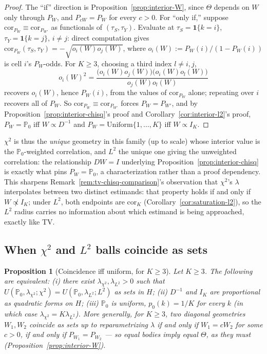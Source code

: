 \documentclass[11pt]{article}
\theoremstyle{plain}
\newtheorem{proposition}[theorem]{Proposition}
\theoremstyle{definition}
\theoremstyle{remark}
\newcommand{\PP}{\mathbb{P}}
\newcommand{\Corr}{\mathrm{cor}}
\begin{document}
\begin{proof}
The ``if'' direction is Proposition~\ref{prop:interior-W}, since $\Theta$ depends on
$W$ only through $P_W$, and $P_{cW}=P_W$ for every $c>0$. For ``only if,'' suppose
$\Corr_{P_W}\equiv\Corr_{P_{W'}}$ as functionals of $(\tau_S,\tau_Y)$. Evaluate at
$\tau_S=\mathbf1\{k=i\}$, $\tau_Y=\mathbf1\{k=j\}$, $i\ne j$: direct computation gives
$\Corr_{P_W}(\tau_S,\tau_Y)=-\sqrt{o_i(W)o_j(W)}$, where
$o_i(W):=P_W(i)/(1-P_W(i))$ is cell $i$'s $P_W$-odds. For $K\ge3$, choosing a third
index $l\ne i,j$,
\[
    o_i(W)^2=\frac{\big(o_i(W)o_j(W)\big)\big(o_i(W)o_l(W)\big)}{o_j(W)o_l(W)}
\]
recovers $o_i(W)$, hence $P_W(i)$, from the values of $\Corr_{P_W}$ alone; repeating
over $i$ recovers all of $P_W$. So $\Corr_{P_W}\equiv\Corr_{P_{W'}}$ forces
$P_W=P_{W'}$, and by Proposition~\ref{prop:interior-chisq}'s proof and
Corollary~\ref{cor:interior-l2}'s proof, $P_W=\PP_0$ iff $W\propto D^{-1}$ and
$P_W=\mathrm{Uniform}\{1,\dots,K\}$ iff $W\propto I_K$.
\end{proof}

$\chi^2$ is thus the \emph{unique} geometry in this family (up to scale) whose interior
value is the $\PP_0$-weighted correlation, and $L^2$ the unique one giving the
unweighted correlation: the relationship $DW=I$ underlying
Proposition~\ref{prop:interior-chisq} is exactly what pins $P_W=\PP_0$, a
characterization rather than a proof dependency. This sharpens
Remark~\ref{rem:tv-chisq-comparison}'s observation that $\chi^2$'s $\lambda$
interpolates between two distinct estimands: that property holds if and only if
$W\not\propto I_K$; under $L^2$, both endpoints are $\Corr_K$
(Corollary~\ref{cor:saturation-l2}), so the $L^2$ radius carries no information about
which estimand is being approached, exactly like TV.

\subsection{When $\chi^2$ and $L^2$ balls coincide as sets}\label{sec:chisq-l2-coincide}

\begin{proposition}[Coincidence iff uniform, for $K\ge3$]\label{prop:chisq-l2-coincide}
Let $K\ge3$. The following are equivalent: (i) there exist
$\lambda_{\chi^2},\lambda_{L^2}>0$ such that $U(\PP_0,\lambda_{\chi^2};\chi^2)
=U(\PP_0,\lambda_{L^2};L^2)$ as sets in $H$; (ii) $D^{-1}$ and $I_K$ are proportional
as quadratic forms on $H$; (iii) $\PP_0$ is uniform, $p_0(k)=1/K$ for every $k$ (in
which case $\lambda_{\chi^2}=K\lambda_{L^2}$). More generally, for $K\ge3$, two
diagonal geometries $W_1,W_2$ coincide as sets up to reparametrizing $\lambda$ if and
only if $W_1=cW_2$ for some $c>0$, if and only if $P_{W_1}=P_{W_2}$ --- so equal
bodies imply equal $\Theta$, as they must (Proposition~\ref{prop:interior-W}).
\end{proposition}
\end{document}
